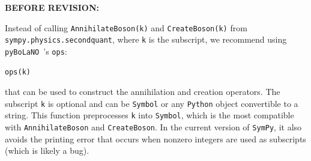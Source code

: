 \documentclass[12pt, a4paper]{article}
\newcommand{\inlinecode}[1]{\texttt{#1}}
\newcommand{\pybolano}{\texttt{pyBoLaNO}~}
\newenvironment{revpre}{%
\textbf{{BEFORE REVISION:}}
\par
}
{\bigskip}
\begin{document}
\begin{revpre}
Instead of calling \inlinecode{AnnihilateBoson(k)} and \inlinecode{CreateBoson(k)} from \inlinecode{sympy.physics.secondquant}, where \inlinecode{k} is the subscript, we recommend using \pybolano's \inlinecode{ops}: 
\begin{verbatim}
ops(k)
\end{verbatim}
that can be used to construct the annihilation and creation operators. The subscript \inlinecode{k} is optional and can be \inlinecode{Symbol} or any \texttt{Python} object convertible to a string. This function preprocesses \inlinecode{k} into \inlinecode{Symbol}, which is the most compatible with \inlinecode{AnnihilateBoson} and \inlinecode{CreateBoson}. In the current version of \texttt{SymPy}, it also avoids the printing error that occurs when nonzero integers are used as subscripts (which is likely a bug).
\end{revpre}

\newpage
\end{document}
